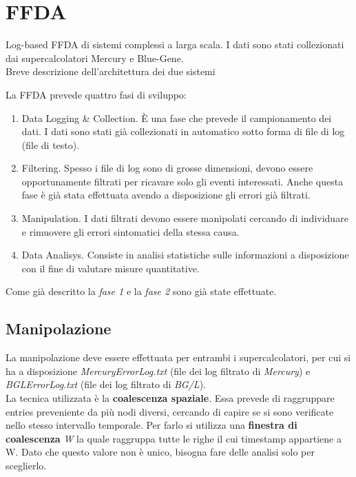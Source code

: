 \chapter{FFDA}
Log-based FFDA di sistemi complessi a larga scala. I dati sono stati collezionati dai supercalcolatori Mercury e Blue-Gene. 
\\Breve descrizione dell'architettura dei due sistemi

La FFDA prevede quattro fasi di sviluppo:
\begin{enumerate}
	\item Data Logging \& Collection. \`{E} una fase che prevede il campionamento dei dati. I dati sono stati già collezionati in automatico sotto forma di file di log (file di testo).
	\item Filtering. Spesso i file di log sono di grosse dimensioni, devono essere opportunamente filtrati per ricavare solo gli eventi interessati. Anche questa fase è già stata effettuata avendo a disposizione gli errori già filtrati.
	\item Manipulation. I dati filtrati devono essere manipolati cercando di individuare e rimuovere gli errori sintomatici della stessa causa.
	\item Data Analisys. Consiste in analisi statistiche sulle informazioni a disposizione con il fine di valutare misure quantitative.
\end{enumerate}
Come già descritto la \textit{fase 1} e la \textit{fase 2} sono già state effettuate.

\section{Manipolazione}
La manipolazione deve essere effettuata per entrambi i supercalcolatori, per cui si ha a disposizione \textit{MercuryErrorLog.txt} (file dei log filtrato di \textit{Mercury}) e \textit{BGLErrorLog.txt} (file dei log filtrato di \textit{BG/L}).
\\La tecnica utilizzata è la \textbf{coalescenza spaziale}. Essa prevede di raggruppare entries preveniente da più nodi diversi, cercando di capire se si sono verificate nello stesso intervallo temporale. Per farlo si utilizza una \textbf{finestra di coalescenza} \textit{W} la quale raggruppa tutte le righe il cui timestamp appartiene a W. Dato che questo valore non è unico, bisogna fare delle analisi solo per sceglierlo.

